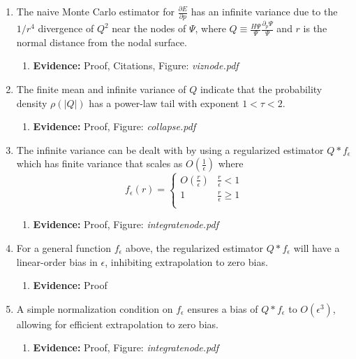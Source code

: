 \documentclass{article}
\begin{document}
\begin{enumerate}
\item The naive Monte Carlo estimator for $\frac{\partial E}{\partial p}$ has an infinite variance due to the $1/r^4$ divergence of $Q^2$ near the nodes of $\Psi$, where $Q \equiv \frac{H\Psi}{\Psi} \frac{\partial_p \Psi}{\Psi}$ and $r$ is the normal distance from the nodal surface.
\begin{enumerate}
\item \textbf{Evidence:} Proof, Citations, Figure: \textit{viznode.pdf}
\end{enumerate}

\item The finite mean and infinite variance of $Q$ indicate that the probability density $\rho(|Q|)$ has a power-law tail with exponent $1 < \tau < 2$.
\begin{enumerate}
\item \textbf{Evidence:} Proof, Figure: \textit{collapse.pdf}
\end{enumerate}

\item The infinite variance can be dealt with by using a regularized estimator $Q * f_\epsilon$ which has finite variance that scales as $O(\frac{1}{\epsilon})$ where 
\[ f_\epsilon(r) = \begin{cases} 
      O(\frac{r}{\epsilon}) & \frac{r}{\epsilon} < 1 \\
      1 & \frac{r}{\epsilon} \ge 1 \\
   \end{cases}
\]
\begin{enumerate}

\item \textbf{Evidence:} Proof, Figure: \textit{integratenode.pdf}
\end{enumerate}

\item For a general function $f_\epsilon$ above, the regularized estimator $Q * f_\epsilon$ will have a linear-order bias in $\epsilon$, inhibiting extrapolation to zero bias.
\begin{enumerate}
\item \textbf{Evidence:} Proof
\end{enumerate}

\item A simple normalization condition on $f_\epsilon$ ensures a bias of $Q * f_\epsilon$ to $O(\epsilon^3)$, allowing for efficient extrapolation to zero bias.
\begin{enumerate}
\item \textbf{Evidence:} Proof, Figure: \textit{integratenode.pdf}
\end{enumerate}


\end{enumerate}
\end{document}
